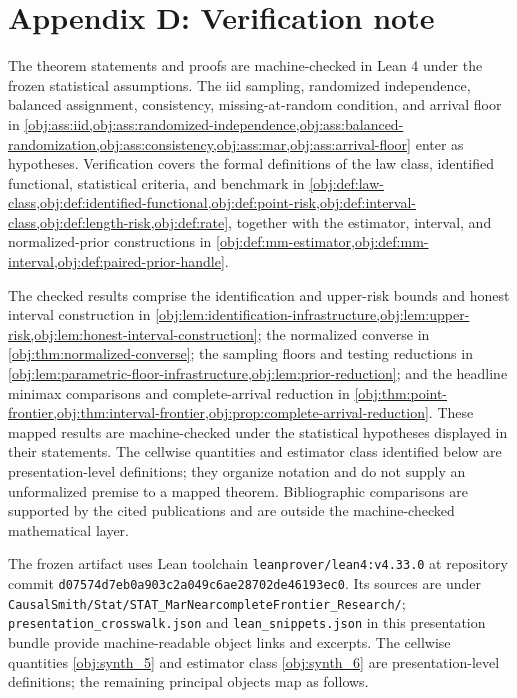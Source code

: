\section{Appendix D: Verification note}

The theorem statements and proofs are machine-checked in Lean 4 under the frozen statistical assumptions. The iid sampling, randomized independence, balanced assignment, consistency, missing-at-random condition, and arrival floor in \cref{obj:ass:iid,obj:ass:randomized-independence,obj:ass:balanced-randomization,obj:ass:consistency,obj:ass:mar,obj:ass:arrival-floor} enter as hypotheses. Verification covers the formal definitions of the law class, identified functional, statistical criteria, and benchmark in \cref{obj:def:law-class,obj:def:identified-functional,obj:def:point-risk,obj:def:interval-class,obj:def:length-risk,obj:def:rate}, together with the estimator, interval, and normalized-prior constructions in \cref{obj:def:mm-estimator,obj:def:mm-interval,obj:def:paired-prior-handle}.

The checked results comprise the identification and upper-risk bounds and honest interval construction in \cref{obj:lem:identification-infrastructure,obj:lem:upper-risk,obj:lem:honest-interval-construction}; the normalized converse in \cref{obj:thm:normalized-converse}; the sampling floors and testing reductions in \cref{obj:lem:parametric-floor-infrastructure,obj:lem:prior-reduction}; and the headline minimax comparisons and complete-arrival reduction in \cref{obj:thm:point-frontier,obj:thm:interval-frontier,obj:prop:complete-arrival-reduction}. These mapped results are machine-checked under the statistical hypotheses displayed in their statements. The cellwise quantities and estimator class identified below are presentation-level definitions; they organize notation and do not supply an unformalized premise to a mapped theorem. Bibliographic comparisons are supported by the cited publications and are outside the machine-checked mathematical layer.

The frozen artifact uses Lean toolchain \texttt{leanprover/lean4:v4.33.0} at repository commit \texttt{d07574d7eb0a903c2a049c6ae28702de46193ec0}. Its sources are under \texttt{CausalSmith/Stat/STAT\_MarNearcompleteFrontier\_Research/}; \texttt{presentation\_crosswalk.json} and \texttt{lean\_snippets.json} in this presentation bundle provide machine-readable object links and excerpts. The cellwise quantities \cref{obj:synth_5} and estimator class \cref{obj:synth_6} are presentation-level definitions; the remaining principal objects map as follows.

